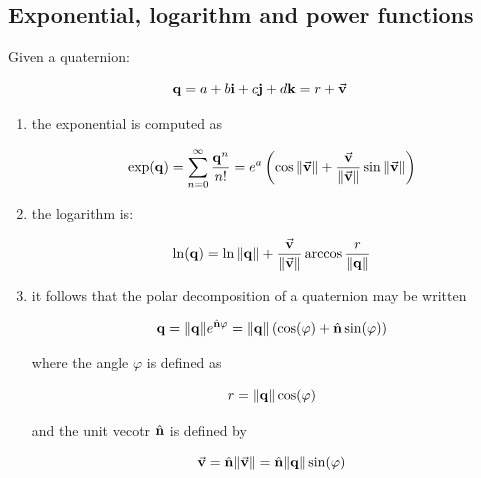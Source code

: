 \subsection{Exponential, logarithm and power functions}

Given a quaternion:

\begin{equation}
    \mathbf{q} = a + b \mathbf{i} + c \mathbf{j} + d \mathbf{k} = r + \vec{\mathbf{v}}
\end{equation}

\begin{enumerate}
    \item the exponential is computed as

        \begin{equation}
            \exp(\mathbf{q}) = \sum_{n=0}^{\infty} \frac{\mathbf{q}^n}{n!}
            = e^a \left( \cos \| {\vec{\mathbf{v}}} \|
            + \frac{\vec{\mathbf{v}}}{\| {\vec{\mathbf{v}}} \|} \sin \| {\vec{\mathbf{v}}} \| \right)
        \end{equation}

    \item the logarithm is:

        \begin{equation}
            \ln(\mathbf{q}) = \ln \| {\mathbf{q}} \|
            + \frac{\vec{\mathbf{v}}}{\| {\vec{\mathbf{v}}} \|}
            \arccos \frac{r}{\| {\mathbf{q}} \|}
        \end{equation}

    \item it follows that the polar decomposition of a quaternion may be written

        \begin{equation}
            \mathbf{q} = \| {\mathbf{q}} \|e^{\hat{\mathbf{n}} \varphi} = \| {\mathbf{q}} \|
            \left( \cos(\varphi) + \hat{\mathbf{n}} \sin(\varphi) \right)
        \end{equation}

        where the angle $ \varphi $ is defined as

        \begin{equation}
            r = \| {\mathbf{q}} \| \cos(\varphi)
        \end{equation}

        and the unit vecotr $ \hat{\mathbf{n}} $ is defined by

        \begin{equation}
            \vec{\mathbf{v}} = \hat{\mathbf{n}} \| {\vec{\mathbf{v}}} \|
            = \hat{\mathbf{n}} \| {\mathbf{q}} \| \sin(\varphi)
        \end{equation}


\end{enumerate}
